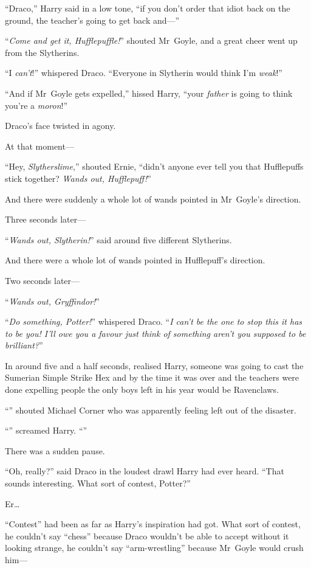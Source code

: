 “Draco,” Harry said in a low tone, “if you don’t order that idiot back on the ground, the teacher’s going to get back and—”

“\emph{Come and get it, Hufflepuffle!}” shouted Mr~Goyle, and a great cheer went up from the Slytherins.

“I \emph{can’t}!” whispered Draco.
“Everyone in Slytherin would think I’m \emph{weak}!”

“And if Mr~Goyle gets expelled,” hissed Harry, “your \emph{father} is going to think you’re a \emph{moron}!”

Draco’s face twisted in agony.

At that moment—

“Hey, \emph{Slytherslime},” shouted Ernie, “didn’t anyone ever tell you that Hufflepuffs stick together? \emph{Wands out, Hufflepuff!}”

And there were suddenly a whole lot of wands pointed in Mr~Goyle’s direction.

Three seconds later—

“\emph{Wands out, Slytherin!}” said around five different Slytherins.

And there were a whole lot of wands pointed in Hufflepuff’s direction.

Two seconds later—

“\emph{Wands out, Gryffindor!}”

“\emph{Do something, Potter!}” whispered Draco. “\emph{I can’t be the one to stop this it has to be you! I’ll owe you a favour just think of something aren’t you supposed to be brilliant?}”

In around five and a half seconds, realised Harry, someone was going to cast the Sumerian Simple Strike Hex and by the time it was over and the teachers were done expelling people the only boys left in his year would be Ravenclaws.

“” shouted Michael Corner who was apparently feeling left out of the disaster.

“” screamed Harry. “”

There was a sudden pause.

“Oh, really?” said Draco in the loudest drawl Harry had ever heard.
“That sounds interesting. What sort of contest, Potter?”

Er…

“Contest” had been as far as Harry’s inspiration had got. What sort of contest, he couldn’t say “chess” because Draco wouldn’t be able to accept without it looking strange, he couldn’t say “arm-wrestling” because Mr~Goyle would crush him—

